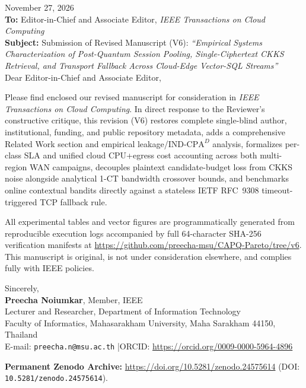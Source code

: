 \documentclass[11pt]{article}
\begin{document}
\sloppy
\noindent November 27, 2026\\[1em]
\textbf{To:} Editor-in-Chief and Associate Editor, \textit{IEEE Transactions on Cloud Computing}\\
\textbf{Subject:} Submission of Revised Manuscript (V6): \textit{``Empirical Systems Characterization of Post-Quantum Session Pooling, Single-Ciphertext CKKS Retrieval, and Transport Fallback Across Cloud-Edge Vector-SQL Streams''}\\[1em]

Dear Editor-in-Chief and Associate Editor,

Please find enclosed our revised manuscript for consideration in \textit{IEEE Transactions on Cloud Computing}. In direct response to the Reviewer's constructive critique, this revision (V6) restores complete single-blind author, institutional, funding, and public repository metadata, adds a comprehensive Related Work section and empirical leakage/$\text{IND-CPA}^D$ analysis, formalizes per-class SLA and unified cloud CPU+egress cost accounting across both multi-region WAN campaigns, decouples plaintext candidate-budget loss from CKKS noise alongside analytical 1-CT bandwidth crossover bounds, and benchmarks online contextual bandits directly against a stateless IETF RFC~9308 timeout-triggered TCP fallback rule.

All experimental tables and vector figures are programmatically generated from reproducible execution logs accompanied by full 64-character SHA-256 verification manifests at \url{https://github.com/preecha-msu/CAPQ-Pareto/tree/v6}. This manuscript is original, is not under consideration elsewhere, and complies fully with IEEE policies.

\vspace{1.2em}
\noindent Sincerely,\\[0.8em]
\textbf{Preecha Noiumkar}, Member, IEEE\\
Lecturer and Researcher, Department of Information Technology\\
Faculty of Informatics, Mahasarakham University, Maha Sarakham 44150, Thailand\\
E-mail: \texttt{preecha.n@msu.ac.th} \quad|\quad ORCID: \url{https://orcid.org/0009-0000-5964-4896}

\smallskip\noindent\textbf{Permanent Zenodo Archive:} \url{https://doi.org/10.5281/zenodo.24575614} (DOI: \texttt{10.5281/zenodo.24575614}).\smallskip
\end{document}
